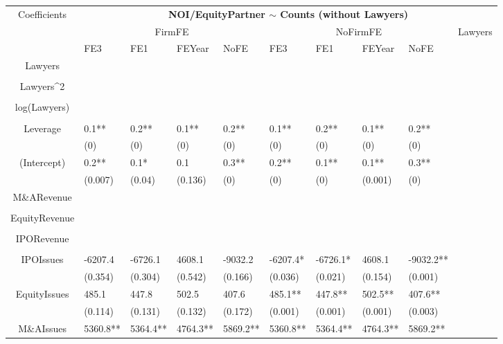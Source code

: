 \documentclass{article}
\begin{document}
\begin{table}[H]
\centering
\begin{tabular}{|clllllllll|}
\hline
\multirow{3}{*}{Coefficients} & \multicolumn{9}{c|}{\textbf{NOI/EquityPartner $\sim$ Counts (without Lawyers)}} \\
\cline{2-10}
& \multicolumn{4}{c}{FirmFE} & \multicolumn{4}{c}{NoFirmFE} & \multirow{2}{*}{Lawyers} \\
\cline{2-9}
& FE3 & FE1 & FEYear & NoFE & FE3 & FE1 & FEYear & NoFE &  \\
\hline
 
Lawyers &  &  &  &  &  &  &  &  & \\ 
   &  &  &  &  &  &  &  &  & \\ 
  Lawyers^2 &  &  &  &  &  &  &  &  & \\ 
   &  &  &  &  &  &  &  &  & \\ 
  log(Lawyers) &  &  &  &  &  &  &  &  & \\ 
   &  &  &  &  &  &  &  &  & \\ 
  Leverage & 0.1** & 0.2** & 0.1** & 0.2** & 0.1** & 0.2** & 0.1** & 0.2** & \\ 
   & (0) & (0) & (0) & (0) & (0) & (0) & (0) & (0) & \\ 
  (Intercept) & 0.2** & 0.1* & 0.1 & 0.3** & 0.2** & 0.1** & 0.1** & 0.3** & \\ 
   & (0.007) & (0.04) & (0.136) & (0) & (0) & (0) & (0.001) & (0) & \\ 
  M\&ARevenue &  &  &  &  &  &  &  &  & \\ 
   &  &  &  &  &  &  &  &  & \\ 
  EquityRevenue &  &  &  &  &  &  &  &  & \\ 
   &  &  &  &  &  &  &  &  & \\ 
  IPORevenue &  &  &  &  &  &  &  &  & \\ 
   &  &  &  &  &  &  &  &  & \\ 
  IPOIssues & -6207.4 & -6726.1 & 4608.1 & -9032.2 & -6207.4* & -6726.1* & 4608.1 & -9032.2** & \\ 
   & (0.354) & (0.304) & (0.542) & (0.166) & (0.036) & (0.021) & (0.154) & (0.001) & \\ 
  EquityIssues & 485.1 & 447.8 & 502.5 & 407.6 & 485.1** & 447.8** & 502.5** & 407.6** & \\ 
   & (0.114) & (0.131) & (0.132) & (0.172) & (0.001) & (0.001) & (0.001) & (0.003) & \\ 
  M\&AIssues & 5360.8** & 5364.4** & 4764.3** & 5869.2** & 5360.8** & 5364.4** & 4764.3** & 5869.2** & \\ 

\end{tabular}
\end{table}
\end{document}
